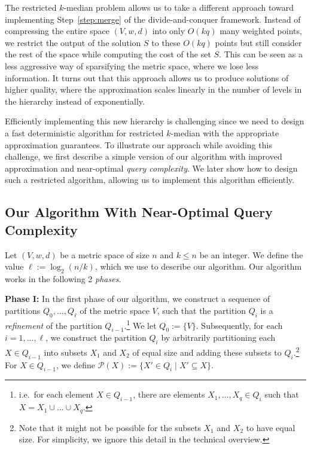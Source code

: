\documentclass[11pt]{article}
\newcommand{\1}{\mathmybb{1}}
\begin{document}
The restricted $k$-median problem allows us to take a different approach toward implementing Step~\ref{step:merge} of the divide-and-conquer framework. Instead of compressing the entire space $(V,w,d)$ into only $O(kq)$ many weighted points, we restrict the output of the solution $S$ to these $O(kq)$ points but still consider the rest of the space while computing the cost of the set $S$.
This can be seen as a less aggressive way of sparsifying the metric space, where we lose less information.
It turns out that this approach allows us to produce solutions of higher quality, where the approximation scales linearly in the number of levels in the hierarchy instead of exponentially.

Efficiently implementing this new hierarchy is challenging since we need to design a fast deterministic algorithm for restricted $k$-median with the appropriate approximation guarantees.
To illustrate our approach while avoiding this challenge, we first describe a simple version of our algorithm with improved approximation and near-optimal \emph{query complexity}. We later show how to design such a restricted algorithm, allowing us to implement this algorithm efficiently.


\subsection{Our Algorithm With Near-Optimal Query Complexity}\label{sec:low query}


Let $(V, w, d)$ be a metric space of size $n$ and $k \leq n$ be an integer.
We define the value $\ell := \log_2(n/k)$, which we use to describe our algorithm.
Our algorithm works in the following 2 \emph{phases}.

\medskip
\noindent
\textbf{Phase I:} In the first phase of our algorithm, we construct a sequence of partitions $Q_0,\dots, Q_\ell$ of the metric space $V$, such that the partition $Q_i$ is a \emph{refinement} of the partition $Q_{i-1}$.\footnote{i.e.~for each element $X \in Q_{i-1}$, there are elements $X_1,\dots, X_q \in Q_i$ such that $X=X_1\cup \dots \cup X_q$.} We let $Q_0 := \{V\}$. Subsequently, for each $i = 1,\dots,\ell$, we construct the partition $Q_i$ by arbitrarily partitioning each $X \in Q_{i-1}$ into subsets $X_1$ and $X_{2}$ of equal size and adding these subsets to $Q_i$.\footnote{Note that it might not be possible for the subsets $X_1$ and $X_{2}$ to have equal size.
For simplicity, we ignore this detail in the technical overview.}
For $X \in Q_{i-1}$, we define $\mathcal P(X) := \{X' \in Q_{i} \mid X' \subseteq X\}$.
\end{document}
